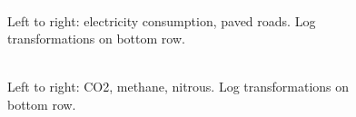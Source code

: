 \documentclass[12pt]{article}
\begin{document}
\begin{figure}[h!]
  \centering
  \includegraphics[width=\textwidth]{images/climate_model_scatter_elec_roads}
  \caption{\label{climate_model_scatter_elec_roads}Left to right: electricity consumption, paved roads. Log transformations on bottom row.}
\end{figure}

\begin{figure}[h!]
  \centering
  \includegraphics[width=\textwidth]{images/climate_model_scatter_pollution}
  \caption{\label{climate_model_scatter_pollution}Left to right: CO2, methane, nitrous. Log transformations on bottom row.}
\end{figure}
\end{document}
